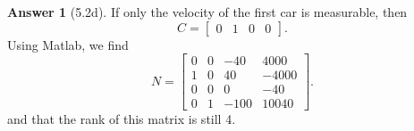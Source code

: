 \documentclass{article}
\theoremstyle{definition}
\newtheorem*{ans}{Answer}
\begin{document}
    \begin{ans}[5.2d]
        If only the velocity of the first car is measurable,
        then 
        \begin{equation*}
            C = 
            \begin{bmatrix}
                0 & 1 & 0 & 0
            \end{bmatrix}
            .
        \end{equation*}
        Using Matlab,
        we find 
        \begin{equation*}
            N = 
            \begin{bmatrix}
                0    &      0    &    -40   &    4000 \\
                1    &      0    &     40   &   -4000 \\
                0    &      0    &      0   &     -40 \\
                0    &      1    &   -100   &   10040
            \end{bmatrix}
            .
        \end{equation*}
        and that the rank of this matrix is still 4.
    \end{ans}
\end{document}
